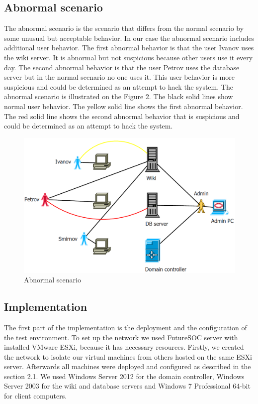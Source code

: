 \subsection{Abnormal scenario}
The abnormal scenario is the scenario that differs from the normal scenario by some unusual but acceptable behavior. In our case the abnormal scenario includes additional user behavior. The first abnormal behavior is that the user Ivanov uses the wiki server. It is abnormal but not suspicious because other users use it every day. The second abnormal behavior is that the user Petrov uses the database server but in the normal scenario no one uses it. This user behavior is more suspicious and could be determined as an attempt to hack the system. The abnormal scenario is illustrated on the Figure 2. The black solid lines show normal user behavior. The yellow solid line shows the first abnormal behavior. The red solid line shows the second abnormal behavior that is suspicious and could be determined as an attempt to hack the system. 
\begin{figure}[ht!]
\centering
\includegraphics[width=\textwidth]{scenario_abnormal.png}
\caption{Abnormal scenario}
\label{overflow}
\end{figure}

\subsection{Implementation}
The first part of the implementation is the deployment and the configuration of the test environment. To set up the network we used FutureSOC server with installed VMware ESXi, because it has necessary resources. Firstly, we created the network to isolate our virtual machines from others hosted on the same ESXi server. Afterwards all machines were deployed and configured as described in the section 2.1. We used Windows Server 2012 for the domain controller, Windows Server 2003 for the wiki and database servers and Windows 7 Professional 64-bit for client computers. 

